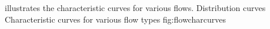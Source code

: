  illustrates the characteristic curves for various flows.
%
   {Distribution curves}
   {Characteristic curves for various flow types}%
   {fig:flowcharcurves}%





